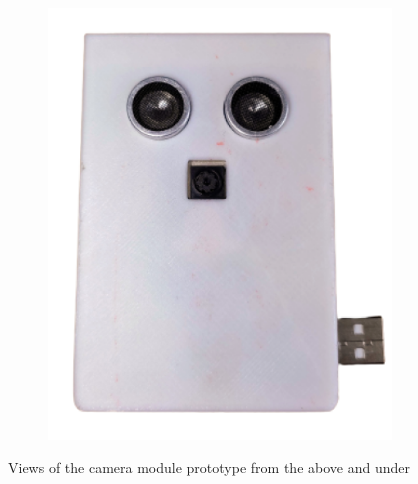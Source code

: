 \begin{figure}[H]
\begin{subfigure}[b]{0.46\textwidth}
    \includegraphics[width=\textwidth]{img/Chap5/Prototype_View_under.png}
  \end{subfigure}
	\caption{Views of the camera module prototype from the above and under}
\end{figure}


